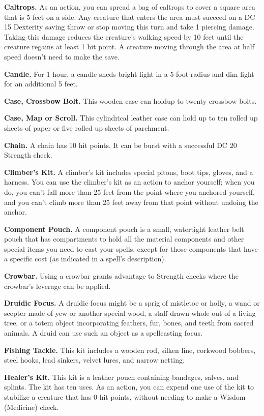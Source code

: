\documentclass[
]{article}
\begin{document}
\textbf{Caltrops.} As an action, you can spread a bag of caltrops to
cover a square area that is 5 feet on a side. Any creature that enters
the area must succeed on a DC 15 Dexterity saving throw or stop moving
this turn and take 1 piercing damage. Taking this damage reduces the
creature's walking speed by 10 feet until the creature regains at least
1 hit point. A creature moving through the area at half speed doesn't
need to make the save.

\textbf{Candle.} For 1 hour, a candle sheds bright light in a 5 foot
radius and dim light for an additional 5 feet.

\textbf{Case, Crossbow Bolt.} This wooden case can holdup to twenty
crossbow bolts.

\textbf{Case, Map or Scroll.} This cylindrical leather case can hold up
to ten rolled up sheets of paper or five rolled up sheets of parchment.

\textbf{Chain.} A chain has 10 hit points. It can be burst with a
successful DC 20 Strength check.

\textbf{Climber's Kit.} A climber's kit includes special pitons, boot
tips, gloves, and a harness. You can use the climber's kit as an action
to anchor yourself; when you do, you can't fall more than 25 feet from
the point where you anchored yourself, and you can't climb more than 25
feet away from that point without undoing the anchor.

\textbf{Component Pouch.} A component pouch is a small, watertight
leather belt pouch that has compartments to hold all the material
components and other special items you need to cast your spells, except
for those components that have a specific cost (as indicated in a
spell's description).

\textbf{Crowbar.} Using a crowbar grants advantage to Strength checks
where the crowbar's leverage can be applied.

\textbf{Druidic Focus.} A druidic focus might be a sprig of mistletoe or
holly, a wand or scepter made of yew or another special wood, a staff
drawn whole out of a living tree, or a totem object incorporating
feathers, fur, bones, and teeth from sacred animals. A druid can use
such an object as a spellcasting focus.

\textbf{Fishing Tackle.} This kit includes a wooden rod, silken line,
corkwood bobbers, steel hooks, lead sinkers, velvet lures, and narrow
netting.

\textbf{Healer's Kit.} This kit is a leather pouch containing bandages,
salves, and splints. The kit has ten uses. As an action, you can expend
one use of the kit to stabilize a creature that has 0 hit points,
without needing to make a Wisdom (Medicine) check.
\end{document}
